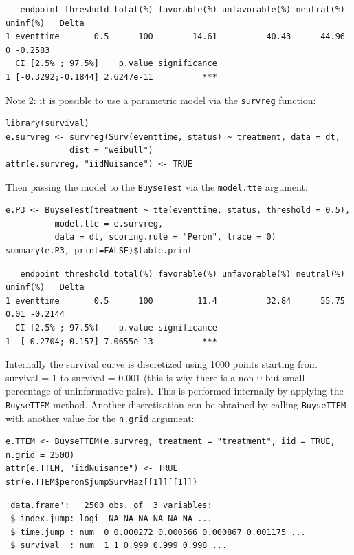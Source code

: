 \documentclass[12pt]{article}
\begin{document}
\begin{verbatim}
   endpoint threshold total(%) favorable(%) unfavorable(%) neutral(%) uninf(%)   Delta
1 eventtime       0.5      100        14.61          40.43      44.96        0 -0.2583
  CI [2.5% ; 97.5%]    p.value significance
1 [-0.3292;-0.1844] 2.6247e-11          ***
\end{verbatim}


\bigskip

\uline{Note 2:} it is possible to use a parametric model via the \texttt{survreg} function:
\lstset{language=r,label= ,caption= ,captionpos=b,numbers=none}
\begin{lstlisting}
library(survival)
e.survreg <- survreg(Surv(eventtime, status) ~ treatment, data = dt, 
		     dist = "weibull")
attr(e.survreg, "iidNuisance") <- TRUE
\end{lstlisting}

Then passing the model to the \texttt{BuyseTest} via the \texttt{model.tte} argument:
\lstset{language=r,label= ,caption= ,captionpos=b,numbers=none}
\begin{lstlisting}
e.P3 <- BuyseTest(treatment ~ tte(eventtime, status, threshold = 0.5),
		  model.tte = e.survreg,
		  data = dt, scoring.rule = "Peron", trace = 0)
summary(e.P3, print=FALSE)$table.print
\end{lstlisting}
\begin{verbatim}
   endpoint threshold total(%) favorable(%) unfavorable(%) neutral(%) uninf(%)   Delta
1 eventtime       0.5      100         11.4          32.84      55.75     0.01 -0.2144
  CI [2.5% ; 97.5%]    p.value significance
1  [-0.2704;-0.157] 7.0655e-13          ***
\end{verbatim}


Internally the survival curve is discretized using 1000 points
starting from survival = 1 to survival = 0.001 (this is why there is a
non-0 but small percentage of uninformative pairs). This is performed
internally by applying the \texttt{BuyseTTEM} method. Another discretisation
can be obtained by calling \texttt{BuyseTTEM} with another value for the \texttt{n.grid} argument:
\lstset{language=r,label= ,caption= ,captionpos=b,numbers=none}
\begin{lstlisting}
e.TTEM <- BuyseTTEM(e.survreg, treatment = "treatment", iid = TRUE, n.grid = 2500)
attr(e.TTEM, "iidNuisance") <- TRUE
str(e.TTEM$peron$jumpSurvHaz[[1]][[1]])
\end{lstlisting}

\begin{verbatim}
'data.frame':	2500 obs. of  3 variables:
 $ index.jump: logi  NA NA NA NA NA NA ...
 $ time.jump : num  0 0.000272 0.000566 0.000867 0.001175 ...
 $ survival  : num  1 1 0.999 0.999 0.998 ...
\end{verbatim}
\end{document}
